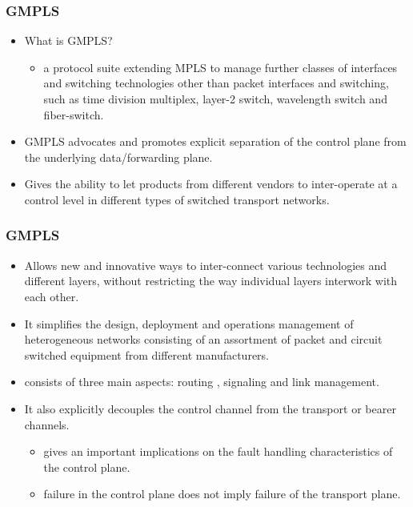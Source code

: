 \documentclass[12pt]{beamer}
\begin{document}
\begin{frame}
  \frametitle{GMPLS}

  \begin{itemize}
  \item What is GMPLS?
  	\begin{itemize}
  		\item  a protocol suite extending MPLS to manage further classes of interfaces and switching technologies other than packet interfaces and switching, such as time division multiplex, layer-2 switch, wavelength switch and fiber-switch.
  	\end{itemize}
  \item GMPLS advocates and promotes explicit separation of the control plane from the underlying data/forwarding plane.
  \item Gives the ability to let products from different vendors to inter-operate at a control level in different types of switched transport networks.

  \end{itemize}
\end{frame}

\begin{frame}
	\frametitle{GMPLS}
	\begin{itemize}								
  \item Allows new and innovative ways to inter-connect various technologies and different layers, without restricting the way individual layers interwork with each other. 
  \item It simplifies the design, deployment and operations management of heterogeneous networks consisting of an assortment of packet and circuit switched equipment from different manufacturers.
  \item consists of three main aspects: routing , signaling and link management.
\end{itemize}		
	\begin{itemize}
		\item It also explicitly decouples the control channel from the transport or bearer channels.
		\begin{itemize}
		\item gives an important implications on the fault handling characteristics of the control plane.
		\item failure in the control plane does not imply failure of the transport plane.
		\end{itemize}
	\end{itemize}
\end{frame}
\end{document}
